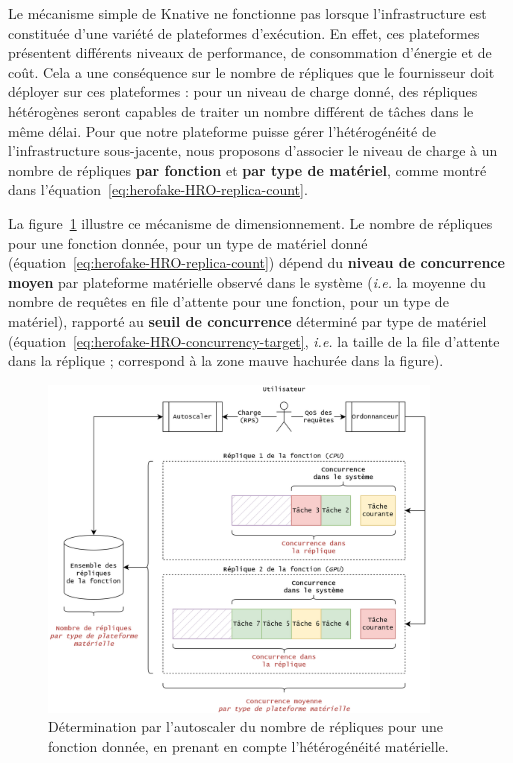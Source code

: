 Le mécanisme simple de Knative ne fonctionne pas lorsque l'infrastructure est constituée d'une variété de plateformes d'exécution. En effet, ces plateformes présentent différents niveaux de performance, de consommation d'énergie et de coût. Cela a une conséquence sur le nombre de répliques que le fournisseur doit déployer sur ces plateformes : pour un niveau de charge donné, des répliques hétérogènes seront capables de traiter un nombre différent de tâches dans le même délai. Pour que notre plateforme puisse gérer l'hétérogénéité de l'infrastructure sous-jacente, nous proposons d'associer le niveau de charge à un nombre de répliques \textbf{par fonction} et \textbf{par type de matériel}, comme montré dans l'équation~\ref{eq:herofake-HRO-replica-count}.

La figure~\ref{figure:herofake-orchestration-scaling} illustre ce mécanisme de dimensionnement. Le nombre de répliques pour une fonction donnée, pour un type de matériel donné (équation~\ref{eq:herofake-HRO-replica-count}) dépend du \textbf{niveau de concurrence moyen} par plateforme matérielle observé dans le système (\textit{i.e.} la moyenne du nombre de requêtes en file d'attente pour une fonction, pour un type de matériel), rapporté au \textbf{seuil de concurrence} déterminé par type de matériel (équation~\ref{eq:herofake-HRO-concurrency-target}, \textit{i.e.} la taille de la file d'attente dans la réplique ; correspond à la zone mauve hachurée dans la figure).

\begin{figure}[!ht]
    \centering
    \includegraphics[width=0.9\textwidth]{4_Chapitre4/figures/orchestration-scaling.png}
    \caption{Détermination par l'autoscaler du nombre de répliques pour une fonction donnée, en prenant en compte l'hétérogénéité matérielle.}
    \label{figure:herofake-orchestration-scaling}
\end{figure}

